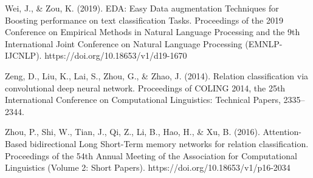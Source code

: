 \documentclass{amia}
\begin{document}
\begin{thebibliography}{12}
Wei, J., \& Zou, K. (2019). EDA: Easy Data augmentation Techniques for Boosting performance on text classification Tasks. Proceedings of the 2019 Conference on Empirical Methods in Natural Language Processing and the 9th International Joint Conference on Natural Language Processing (EMNLP-IJCNLP). https://doi.org/10.18653/v1/d19-1670

Zeng, D., Liu, K., Lai, S., Zhou, G., \& Zhao, J. (2014). Relation classification via convolutional deep neural network. Proceedings of COLING 2014, the 25th International Conference on Computational Linguistics: Technical Papers, 2335–2344.

Zhou, P., Shi, W., Tian, J., Qi, Z., Li, B., Hao, H., \& Xu, B. (2016). Attention-Based bidirectional Long Short-Term memory networks for relation classification. Proceedings of the 54th Annual Meeting of the Association for Computational Linguistics (Volume 2: Short Papers). https://doi.org/10.18653/v1/p16-2034

\end{thebibliography}
\end{document}

